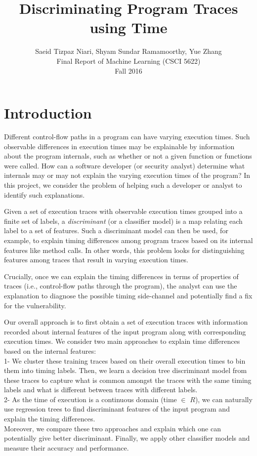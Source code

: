 \documentclass{article}
\begin{document}
\title{Discriminating Program Traces using Time}
\author{Saeid Tizpaz Niari, Shyam Sundar Ramamoorthy, Yue Zhang \\ Final Report of Machine Learning (CSCI 5622)  \\ Fall 2016}
\date{}
\maketitle

\section{Introduction}
Different control-flow paths in a program can have varying execution times.
Such observable differences in execution times may be explainable by
information about the program internals, such as whether or not a given function or
functions were called. 
How can a software developer (or security analyst)
determine what internals may or may not explain the varying
execution times of the program? In this project, we consider the problem
of helping such a developer 
or analyst to identify such explanations. 

Given a set of execution traces with observable execution times grouped
into a finite set of labels, a \emph{discriminant} (or a classifier model) is
a map relating each label to a set of features. Such a discriminant model can then be used,
for example, to explain timing differences among program traces based on
its internal features like method calls.  In other words, this problem looks for
distinguishing features among traces that result in
varying execution times.

Crucially, once we can explain the timing
differences in terms of properties of traces (i.e., control-flow paths through
the program), the analyst can use the explanation to diagnose the possible
timing side-channel and potentially find a fix for the vulnerability. 

Our overall approach is to first obtain a set of execution traces
with information recorded about internal features of the input program
along with corresponding execution times. We consider two main
approaches to explain time differences based on the internal features: \\
1- We cluster these training traces based on their overall execution times
to bin them into timing labels. Then, we learn a decision tree discriminant
model from these traces to capture what is common amongst the traces with the
same timing labels and what is different between traces with different labels. \\
2- As the time of execution is a continuous domain (time $\in$ $R$), we can
naturally use regression trees to find discriminant features of the input
program and explain the timing differences. \\
Moreover, we compare these
two approaches and explain which one can potentially give better discriminant. 
Finally, we apply other classifier models and measure their accuracy and performance.
\end{document}
